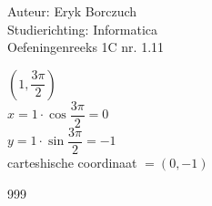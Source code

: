\documentclass[a4paper]{article}
\begin{document}
  
\noindent \large Auteur: Eryk Borczuch \\
\noindent \large Studierichting: Informatica\\
\noindent \large Oefeningenreeks 1C nr. 1.11\\

\medskip

\normalsize

$\left(1, \dfrac{3\pi}{2}\right)$\\

$x = 1 \cdot \cos \dfrac{3\pi}{2} = 0$\\

$y = 1 \cdot \sin \dfrac{3\pi}{2} = -1$\\

carteshische coordinaat $= (0,-1)$\\

\begin{thebibliography}{999}
\end{thebibliography}
\end{document}

